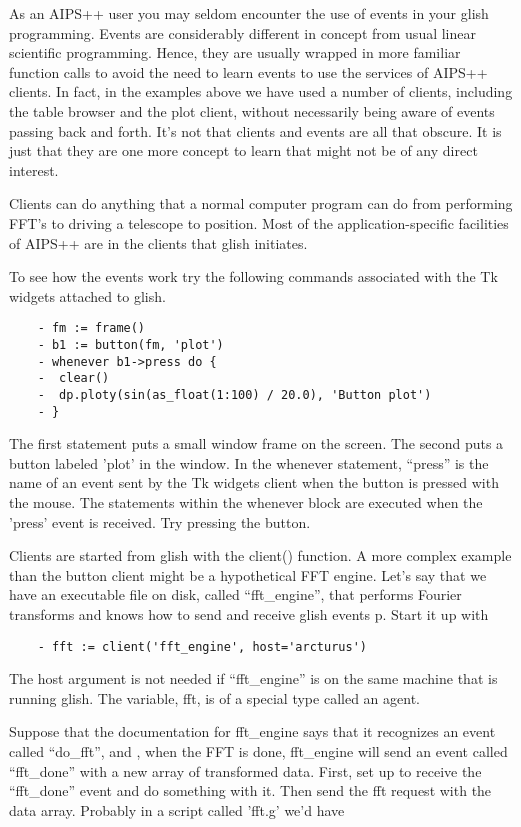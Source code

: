     As an AIPS++ user you may seldom encounter the use of events in your
glish programming.  Events are considerably different in concept from usual
linear scientific programming.  Hence, they are usually wrapped in more
familiar function calls to avoid the need to learn events to use the
services of AIPS++ clients.  In fact, in the examples above we have used
a number of clients, including the table browser and the plot client,
without necessarily being aware of events passing back and forth.  It's not
that clients and events are all that obscure.  It is just that they are one
more concept to learn that might not be of any direct interest.

    Clients can do anything that a normal computer program can do from
performing FFT's to driving a telescope to position.  Most of the
application-specific facilities of AIPS++ are in the clients that glish
initiates.

    To see how the events work try the following commands associated with
the Tk widgets attached to glish.

\begin{verbatim}
	- fm := frame()
	- b1 := button(fm, 'plot')
	- whenever b1->press do {
	-  clear()
	-  dp.ploty(sin(as_float(1:100) / 20.0), 'Button plot')
	- }
\end{verbatim}

The first statement puts a small window frame on the screen.  The second
puts a button labeled 'plot' in the window.  In the whenever statement,
``press'' is the name of an event sent by the Tk widgets client when the
button is pressed with the mouse.  The statements within the whenever block
are executed when the 'press' event is received.  Try pressing the button.

    Clients are started from glish with the client() function.  A more
complex example than the button client might be a hypothetical FFT engine.
Let's say that we have an executable file on disk, called ``fft\_engine'',
that performs Fourier transforms and knows how to send and receive glish
events p.  Start it up with

\begin{verbatim}
	- fft := client('fft_engine', host='arcturus')
\end{verbatim}

The host argument is not needed if ``fft\_engine'' is on the same machine that
is running glish.  The variable, fft, is of a special type called an agent.

    Suppose that the documentation for fft\_engine says that it recognizes
an event called ``do\_fft'', and , when the FFT is done, fft\_engine will send
an event called ``fft\_done'' with a new array of transformed data.  First,
set up to receive the ``fft\_done'' event and do something with it.  Then send
the fft request with the data array.  Probably in a script called 'fft.g'
we'd have

